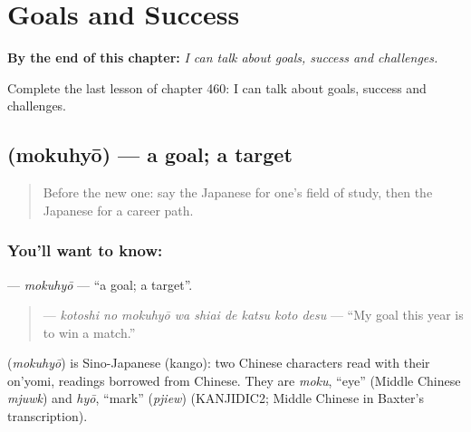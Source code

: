 
\chapter{Goals and Success}
\label{ch:ja-goals-and-success}

\begin{chapteropening}
\textbf{By the end of this chapter:} \emph{I can talk about goals, success and challenges.}

Complete the last lesson of chapter 460: I can talk about goals, success and challenges.
\end{chapteropening}

\section[\texorpdfstring{\ja{もくひょう} (mokuhyō)}{もくひょう (mokuhyō)}]{ (mokuhyō) — a goal; a target}

\label{lesson:JA-C460-mokuhyou}



\begin{quote}
Before the new one: say the Japanese for one's field of study, then the Japanese for a career path.
\end{quote}

\subsection*{You'll want to know: }
\textbf{} — \emph{mokuhyō} — \textquotedblleft{}a goal; a target\textquotedblright{}.

\begin{quote}
\textbf{    } — \emph{kotoshi no mokuhyō wa shiai de katsu koto desu} — \textquotedblleft{}My goal this year is to win a match.\textquotedblright{}
\end{quote}

\begin{cousinweb}
\textbf{} (\emph{mokuhyō}) is Sino-Japanese (kango): two Chinese characters read with their on'yomi, readings borrowed from Chinese. They are \emph{moku}, \textquotedblleft{}eye\textquotedblright{} (Middle Chinese \emph{mjuwk}) and \emph{hyō}, \textquotedblleft{}mark\textquotedblright{} (\emph{pjiew}) (KANJIDIC2; Middle Chinese in Baxter's transcription).
\end{cousinweb}

